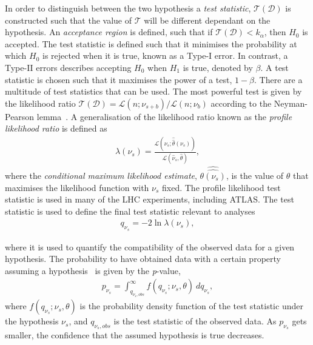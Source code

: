 In order to distinguish between the two hypothesis a \emph{test statistic}, $\mathcal{T}(\mathcal{D})$ is constructed such that the value of $\mathcal{T}$ will be different dependant on the hypothesis. An \emph{acceptance region} is defined, such that if $\mathcal{T}(\mathcal{D}) < k_\alpha$, then $H_0$ is accepted. The test statistic is defined such that it minimises the probability at which $H_0$ is rejected when it is true, known as a Type-I error. In contrast, a Type-II errors describes accepting $H_0$ when $H_1$ is true, denoted by $\beta$. A test statistic is chosen such that it maximises the power of a test, $1-\beta$. There are a multitude of test statistics that can be used. The most powerful test is given by the likelihood ratio $\mathcal{T}(\mathcal{D}) = \mathcal{L}(n;\nu_{s+b})/\mathcal{L}(n;\nu_{b})$ according to the Neyman-Pearson lemma~\cite{Cowan1998}. A generalisation of the likelihood ratio known as the \emph{profile likelihood ratio} is defined as
\begin{equation}
    \label{eq:profLL}
    \begin{aligned}
        \lambda(\nu_s) = \frac{\mathcal{L}(\nu_s;\hat{\hat{\theta}}(\nu_s))}{\mathcal{L}(\hat{\nu}_s,\hat{\theta})},
    \end{aligned}
\end{equation}
where the \emph{conditional maximum likelihood estimate}, $\hat{\hat{\theta(\nu_s)}}$,  is the value of $\theta$ that maximises the likelihood function with $\nu_s$ fixed. The profile likelihood test statistic is used in many of the LHC experiments, including ATLAS. The test statistic is used to define the final test statistic relevant to analyses
\begin{equation}
    \label{eq:teststat}
    \begin{aligned}
        q_{\nu_s} = -2\ln\lambda(\nu_s),
    \end{aligned}
\end{equation}

where it is used to quantify the compatibility of the observed data for a given hypothesis. The probability to have obtained data with a certain property assuming a hypothesis~\cite{Cranmer:2015nia} is given by the \emph{p}-value, 
\begin{equation}
    \label{eq:pvalue}
    \begin{aligned}
        p_{\nu_s} = \int_{q_{\nu_{s},obs}}^\infty f(q_{\nu_s};\nu_s,\theta)~dq_{\nu_s},
    \end{aligned}
\end{equation}
where $f(q_{\nu_s};\nu_s,\theta)$ is the probability density function of the test statistic under the hypothesis $\nu_s$, and $q_{\nu_s,obs}$ is the test statistic of the observed data. As $p_{\nu_s}$ gets smaller, the confidence that the assumed hypothesis is true decreases. 

